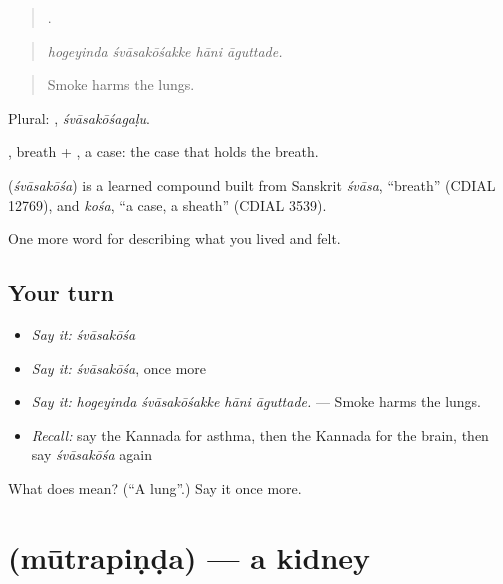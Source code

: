 \begin{quote}
   .
\end{quote}

\begin{quote}
\emph{hogeyinda śvāsakōśakke hāni āguttade.}
\end{quote}

\begin{quote}
Smoke harms the lungs.
\end{quote}

Plural: , \emph{śvāsakōśagaḷu}.

, breath + , a case: the case that holds the breath.

\begin{cousinweb}
\textbf{} (\emph{śvāsakōśa}) is a learned compound built from Sanskrit \emph{śvāsa}, \textquotedblleft{}breath\textquotedblright{} (CDIAL 12769), and \emph{kośa}, \textquotedblleft{}a case, a sheath\textquotedblright{} (CDIAL 3539).
\end{cousinweb}

\begin{grammarlens}[title={What you've built}]
One more word for describing what you lived and felt.
\end{grammarlens}

\subsection*{Your turn}
\begin{itemize}
\raggedright
  \item \emph{Say it:} \emph{śvāsakōśa}
  \item \emph{Say it:} \emph{śvāsakōśa}, once more
  \item \emph{Say it:} \emph{hogeyinda śvāsakōśakke hāni āguttade.} — Smoke harms the lungs.
  \item \emph{Recall:} say the Kannada for asthma, then the Kannada for the brain, then say \emph{śvāsakōśa} again
\end{itemize}

\begin{tcolorbox}[breakable,colback=teal!4,colframe=teal!35!black,title={Before you move on}]
What does  mean? (\textquotedblleft{}A lung\textquotedblright{}.) Say it once more.
\end{tcolorbox}
\section[\texorpdfstring{\kn{ಮೂತ್ರಪಿಂಡ} (mūtrapiṇḍa)}{ಮೂತ್ರಪಿಂಡ (mūtrapiṇḍa)}]{ (mūtrapiṇḍa) — a kidney}

